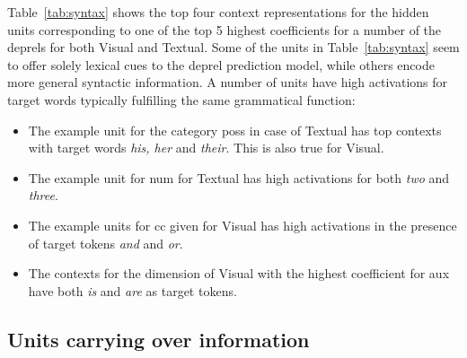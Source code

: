 \begin{table}
\begin{center}
\begin{tabular}{|p{6cm}| p{6cm}|}
    



    
    
    \end{tabular}
\end{center}
\end{table}

Table~\ref{tab:syntax} shows the top four context representations for the hidden units 
corresponding to one of the top 5 highest coefficients for a number of the deprels for 
both {\sc Visual} and {\sc Textual}. Some of the units in 
Table~\ref{tab:syntax} seem to offer solely lexical cues to the deprel prediction model, 
while others encode more general syntactic information. 
A number of units have high activations for target words typically fulfilling the same grammatical function:

\begin{itemize}
    \item The example unit for the category {\sc poss} in case of {\sc Textual} has top contexts with target words {\it his, her} and {\it their}. This is also true for {\sc Visual}.
    \item The example unit for {\sc num} for {\sc Textual} has high activations for both {\it two} and {\it three}.
    \item The example units for {\sc cc} given for {\sc Visual} has high activations in the presence of target tokens {\it and} and {\it or}.
    \item The contexts for the dimension of {\sc Visual} with the highest coefficient for {\sc aux} have both {\it is} and {\it are} as target tokens.
\end{itemize}

\subsection{Units carrying over information}
\label{sec:carryover}

